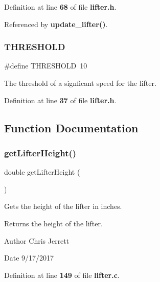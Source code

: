 Definition at line \textbf{ 68} of file \textbf{ lifter.\+h}.



Referenced by \textbf{ update\+\_\+lifter()}.

\mbox{\label{lifter_8h_a4679d8ea8690999a6c6c7c0cb245c879}} 
\subsubsection{T\+H\+R\+E\+S\+H\+O\+LD}
{\footnotesize\ttfamily \#define T\+H\+R\+E\+S\+H\+O\+LD~10}



The threshold of a signficant speed for the lifter. 



Definition at line \textbf{ 37} of file \textbf{ lifter.\+h}.



\subsection{Function Documentation}
\mbox{\label{lifter_8h_a2719740958fd8a5926f88f6194e820e3}} 
\subsubsection{get\+Lifter\+Height()}
{\footnotesize\ttfamily double get\+Lifter\+Height (\begin{DoxyParamCaption}{ }\end{DoxyParamCaption})}



Gets the height of the lifter in inches. 

\begin{DoxyReturn}{Returns}
the height of the lifter. 
\end{DoxyReturn}
\begin{DoxyAuthor}{Author}
Chris Jerrett 
\end{DoxyAuthor}
\begin{DoxyDate}{Date}
9/17/2017 
\end{DoxyDate}


Definition at line \textbf{ 149} of file \textbf{ lifter.\+c}.



